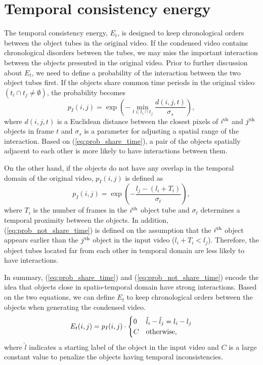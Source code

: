 \documentclass[11pt]{hyu_thesis}
\begin{document}
\section{Temporal consistency energy}
The temporal consistency energy, $E_t$, is designed to keep chronological orders between the object tubes in the original video. If the condensed video contains chronological disorders between the tubes, we may miss the important interaction between the objects presented in the original video. Prior to further discussion about $E_t$, we need to define a probability of the interaction between the two object tubes first. If the objects share common time periods in the original video $(t_i \cap t_j \neq \emptyset)$, the probability becomes
\begin{equation}
\label{eq:prob_share_time}
p_I(i, j) = 
\exp\left(-\min_{t \in t_i \cap t_j} \frac{d(i,j,t)}{\sigma_s}\right),
\end{equation}
where $d(i,j,t)$ is a Euclidean distance between the closest pixels of $i^{\rm{th}}$ and $j^{\rm{th}}$ objects in frame $t$ and $\sigma_s$ is a parameter for adjusting a spatial range of the interaction. Based on (\ref{eq:prob_share_time}), a pair of the objects spatially adjacent to each other is more likely to have interactions between them.

On the other hand, if the objects do not have any overlap in the temporal domain of the original video, $p_I(i,j)$ is defined as
\begin{equation}
\label{eq:prob_not_share_time}
p_I(i,j)=\exp\left(-\frac{l_j - (l_i + T_i)}{\sigma_t}\right),
\end{equation}
where $T_i$ is the number of frames in the $i^{\rm{th}}$ object tube and $\sigma_t$ determines a temporal proximity between the objects. In addition, (\ref{eq:prob_not_share_time}) is defined on the assumption that the $i^{\rm{th}}$ object appears earlier than the $j^{\rm{th}}$ object in the input video ($l_i + T_i < l_j$). Therefore, the object tubes located far from each other in temporal domain are less likely to have interactions.

In summary, (\ref{eq:prob_share_time}) and (\ref{eq:prob_not_share_time}) encode the idea that objects close in spatio-temporal domain have strong interactions. Based on the two equations, we can define $E_t$ to keep chronological orders between the objects when generating the condensed video.
\begin{equation}
\label{eq:Et}
E_t(i,j)=
p_I(i, j) \cdot
\begin{cases}
0 & \hat{l}_i - \hat{l}_j = l_i - l_j \\
C & \rm{otherwise},
\end{cases}
\end{equation}
where $\hat{l}$ indicates a starting label of the object in the input video and $C$ is a large constant value to penalize the objects having temporal inconsistencies. 
\end{document}
